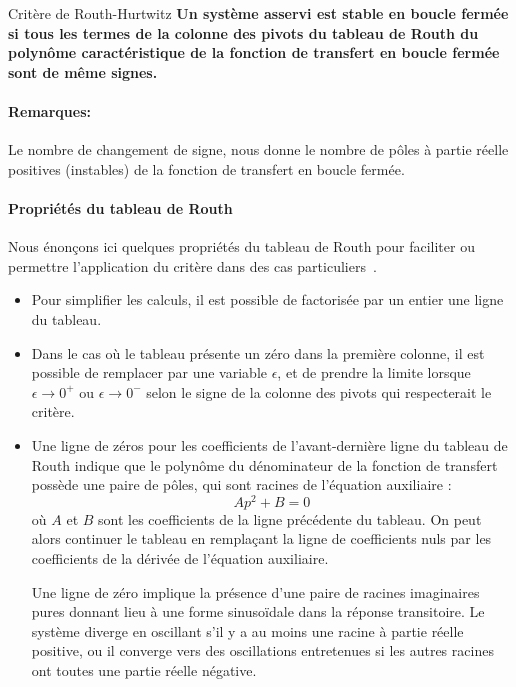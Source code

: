 \begin{criteria}{Critère de Routh-Hurtwitz}
    \textbf{Un système asservi est stable en boucle fermée
            si tous les termes de la colonne des pivots 
            du tableau de Routh du polynôme caractéristique 
            de la fonction de transfert en boucle fermée sont de même signes.}
\end{criteria}

\paragraph{Remarques:}
Le nombre de changement de signe, nous donne le nombre de pôles à partie réelle positives (instables)
de la fonction de transfert en boucle fermée.


\paragraph{Propriétés du tableau de Routh}

Nous énonçons ici quelques propriétés du tableau de Routh 
pour faciliter ou permettre l'application du critère dans 
des cas particuliers~\cite{Ostertag}. 

\begin{itemize}
    \item Pour simplifier les calculs, il est possible de factorisée par un entier une ligne du tableau.
    \item Dans le cas où le tableau présente un zéro dans la première 
          colonne, il est possible de remplacer par une variable $\epsilon$, et de prendre la limite
          lorsque $\epsilon\rightarrow 0^+$ ou $\epsilon\rightarrow 0^-$ selon le signe de la colonne des pivots
          qui respecterait le critère.
    \item Une ligne de zéros pour les coefficients de l'avant-dernière ligne du tableau de
    Routh indique que le polynôme du dénominateur de la fonction de transfert 
        possède une paire de pôles, qui sont racines de l'équation auxiliaire :
    $$
    Ap^2+B=0
    $$
    où $A$ et $B$ sont les coefficients de la ligne précédente du tableau. On peut alors 
    continuer le tableau en remplaçant la
    ligne de coefficients nuls par les coefficients de la dérivée de l'équation auxiliaire.
    
    Une ligne de zéro implique la présence d'une paire de racines imaginaires pures
    donnant lieu à une forme sinuso\"idale dans la réponse transitoire.
    Le système diverge en oscillant s'il y a au moins une racine à partie réelle positive,
    ou il converge vers des oscillations entretenues si les autres racines ont toutes une partie réelle négative.

\end{itemize}

